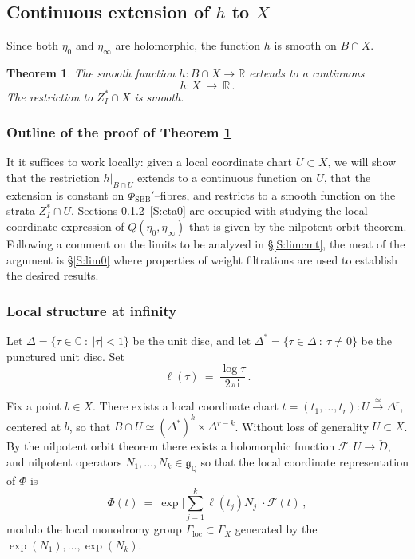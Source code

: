 \documentclass[12pt]{amsart}
\numberwithin{equation}{section}
\numberwithin{table}{section}
\def\bC{\mathbb{C}}
\def\sF{\mathscr{F}}
\def\fg{\mathfrak{g}}
\def\bi{\mathbf{i}}
\def\bQ{\mathbb{Q}}
\def\bR{\mathbb{R}}
\newtheorem{theorem}[equation]{Theorem}
\theoremstyle{definition}
\theoremstyle{definition}
\theoremstyle{remark}
\def\hPhiS{\Phi_\mathrm{SBB}'}
\begin{document}
\subsection{Continuous extension of $h$ to $X$} \label{S:extnh}

Since both $\eta_0$ and $\eta_\infty$ are holomorphic, the function $h$ is smooth on $B \cap X$.  

\begin{theorem} \label{T:extn}
The smooth function $h : B \cap X \to \bR$ extends to a continuous 
\[
  h : X \ \to \ \bR \,.
\]
The restriction to $Z_I^* \cap X$ is smooth.
\end{theorem}

\subsubsection{Outline of the proof of Theorem  \ref{T:extn}}

It it suffices to work locally: given a local coordinate chart $U \subset X$, we will show that the restriction $h\big|_{B \cap U}$ extends to a continuous function on $U$, that the extension is constant on $\hPhiS$--fibres, and restricts to a smooth function on the strata $Z_I^* \cap U$.  Sections \ref{S:loc1}--\ref{S:eta0} are occupied with studying the local coordinate expression of $Q(\eta_0,\overline{\eta_\infty})$ that is given by the nilpotent orbit theorem.  Following a comment on the limits to be analyzed in \S\ref{S:limcmt}, the meat of the argument is \S\ref{S:lim0} where properties of weight filtrations are used to establish the desired results.

\subsubsection{Local structure at infinity} \label{S:loc1}

Let $\Delta = \{ \tau \in \bC \ : \ |\tau| < 1 \}$ be the unit disc, and let $\Delta^* = \{ \tau \in \Delta \ : \ \tau\not=0\}$ be the punctured unit disc.  Set
\[
  \ell(\tau) \ = \ \frac{\log \tau}{2\pi\bi} \,.
\]

Fix a point $b\in X$.  There exists a local coordinate chart $t = (t_1,\ldots,t_r) : U \stackrel{\simeq}{\longrightarrow} \Delta^r$, centered at $b$, so that $B \cap U \simeq (\Delta^*)^k \times \Delta^{r-k}$.  Without loss of generality $U \subset X$.  By the nilpotent orbit theorem \cite{MR0382272} there exists a holomorphic function $\sF : U \to \check D$, and nilpotent operators $N_1 , \ldots , N_k \in \fg_\bQ$ so that the local coordinate representation of $\Phi$ is
\[
  \Phi(t) \ = \ 
  \exp \Big[ \sum_{j=1}^k \ell(t_j) N_j \Big] \cdot \sF(t) \,,
\]
modulo the local monodromy group $\Gamma_\mathrm{loc} \subset \Gamma_X$ generated by the $\exp(N_1),\ldots,\exp(N_k)$.  
\end{document}
